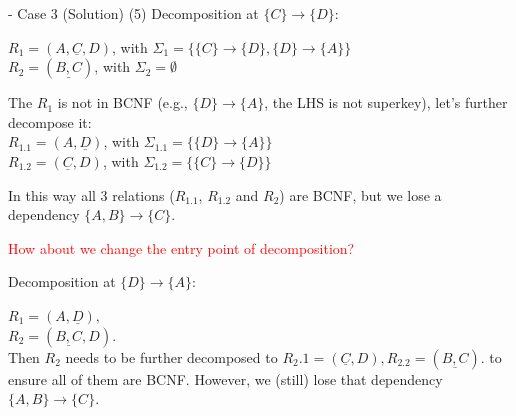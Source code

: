 \begin{frame}[fragile]{ - Case 3 (Solution)}
	(5) Decomposition at $\{C\} \rightarrow \{D\}$:\\\vspace{3pt}
	
	$R_1 = (A, \underline{C}, D)$, with $\Sigma_1 =\{\{C\} \rightarrow \{D\}, \{D\} \rightarrow \{A\}\}$\\
	$R_2 = (\underline{B,C})$, with $\Sigma_2 =\emptyset$\\\vspace{3pt}
	
	The $R_1$ is not in BCNF (e.g., $\{D\} \rightarrow \{A\}$, the LHS is not superkey), let's further decompose it:\\
	$R_{1.1} = (A, \underline{D})$, with $\Sigma_{1.1} =\{\{D\} \rightarrow \{A\}\}$\\
	$R_{1.2} = (\underline{C}, D)$, with $\Sigma_{1.2} =\{\{C\} \rightarrow \{D\}\}$\\\vspace{3pt}
	
	In this way all 3 relations ($R_{1.1}$, $R_{1.2}$ and $R_{2}$) are BCNF, but we lose a dependency $\{A, B\} \rightarrow \{C\}$.\\\vspace{10pt}
	
	\textcolor{red}{How about we change the entry point of decomposition?}\\\vspace{3pt}
	
	Decomposition at $\{D\} \rightarrow \{A\}$:\\\vspace{3pt}
	
	$R_1 = (A, \underline{D}),$\\
	$R_2 = (\underline{B,C}, D).$\\\vspace{5pt}
	Then $R_2$ needs to be further decomposed to $R_{2}.1 = (\underline{C}, D), R_{2.2} = (\underline{B,C}).$ to ensure all of them are BCNF. However, we (still) lose that dependency $\{A, B\} \rightarrow \{C\}$.
\end{frame}


